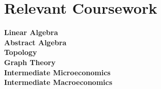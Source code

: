 \documentclass[letterpaper,11pt]{article}
\begin{document}
 \section{Relevant Coursework}
\begin{itemize}[leftmargin=0.15in, label={}]
    \normalsize{\item{
        \textbf{Linear Algebra}\\
        \textbf{Abstract Algebra}\\
        \textbf{Topology}\\
        \textbf{Graph Theory}\\
        \textbf{Intermediate Microeconomics}\\
        \textbf{Intermediate Macroeconomics}

    }}    
 \end{itemize}
\end{document}
